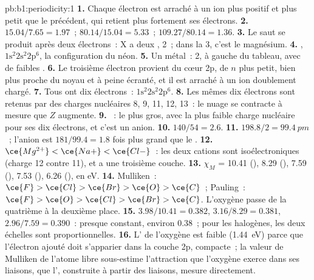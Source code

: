 \begin{solution}{pb:b1:periodicity:1}
\textbf{1.} Chaque électron est arraché à un ion plus positif et plus
petit que le précédent, qui retient plus fortement ses électrons.
\textbf{2.} $15.04/7.65 = 1.97$~; $80.14/15.04 = 5.33$~; $109.27/80.14 = 1.36$.
\textbf{3.} Le saut se produit après deux électrons~: X a deux ,  2~; dans la  3, c'est le magnésium.
\textbf{4.} , $1\text{s}^2 2\text{s}^2 2\text{p}^6$, la
configuration du néon.
\textbf{5.} Un métal~:  2, à gauche du tableau, avec de faibles
.
\textbf{6.} Le troisième électron provient du cœur 2p, de $n$ plus petit,
bien plus proche du noyau et à peine écranté, et il est arraché à un ion
doublement chargé.
\textbf{7.} Tous ont dix électrons~: $1\text{s}^2 2\text{s}^2 2\text{p}^6$.
\textbf{8.} Les mêmes dix électrons sont retenus par des charges
nucléaires 8, 9, 11, 12, 13~: le nuage se contracte à mesure que $Z$
augmente.
\textbf{9.} ~: le plus gros, avec la plus faible charge
nucléaire pour ses dix électrons, et c'est un anion.
\textbf{10.} $140/54 = 2.6$.
\textbf{11.} $198.8/2 = \qty{99.4}{pm}$~; l'anion est $181/99.4 = 1.8$
fois plus grand que le .
\textbf{12.} $\ce{Mg^{2+}} < \ce{Na+} < \ce{Cl-}$~: les deux cations
sont isoélectroniques (charge 12 contre 11), et  a une troisième
couche.
\textbf{13.} $\chi_M$ = 10.41 (), 8.29 (), 7.59 (),
7.53 (), 6.26 (), en eV.
\textbf{14.} Mulliken~: $\ce{F} > \ce{Cl} > \ce{Br} > \ce{O} > \ce{C}$~;
Pauling~: $\ce{F} > \ce{O} > \ce{Cl} > \ce{Br} > \ce{C}$. L'oxygène passe
de la quatrième à la deuxième place.
\textbf{15.} $3.98/10.41 = 0.382$, $3.16/8.29 = 0.381$, $2.96/7.59 =
0.390$~: presque constant, environ 0.38~; pour les halogènes, les deux
échelles sont proportionnelles.
\textbf{16.} L' de l'oxygène est faible
(\qty{1.44}{eV}) parce que l'électron ajouté doit s'apparier dans la
couche 2p, compacte~; la valeur de Mulliken de l'atome libre sous-estime
l'attraction que l'oxygène exerce dans ses liaisons, que l', construite à partir des liaisons, mesure directement.

\end{solution}
